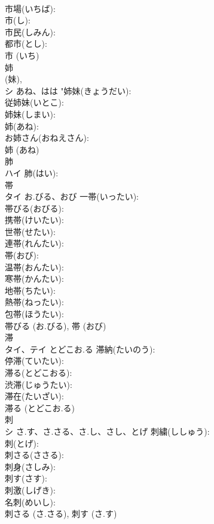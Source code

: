 \documentclass[8pt]{extreport}
\begin{document}
\begin{CJK}{UTF8}{min}
\\	市場(いちば): 
\\	市(し): 
\\	市民(しみん): 
\\	都市(とし): 
\\	市 (いち)
\\	姉			
\\	(妹), 
\\	シ	あね、はは	"姉妹(きょうだい): 
\\	従姉妹(いとこ): 
\\	姉妹(しまい): 
\\	姉(あね): 
\\	お姉さん(おねえさん): 
\\	姉 (あね)
\\	肺			
\\	ハイ		肺(はい): 
\\	帯			
\\	タイ	お.びる、おび	一帯(いったい): 
\\	帯びる(おびる): 
\\	携帯(けいたい): 
\\	世帯(せたい): 
\\	連帯(れんたい): 
\\	帯(おび): 
\\	温帯(おんたい): 
\\	寒帯(かんたい): 
\\	地帯(ちたい): 
\\	熱帯(ねったい): 
\\	包帯(ほうたい): 
\\	帯びる (お.びる), 帯 (おび)
\\	滞			
\\	タイ、テイ	とどこお.る	滞納(たいのう): 
\\	停滞(ていたい): 
\\	滞る(とどこおる): 
\\	渋滞(じゅうたい): 
\\	滞在(たいざい): 
\\	滞る (とどこお.る)
\\	刺			
\\	シ	さ.す、さ.さる、さ.し、さし、とげ	刺繍(ししゅう): 
\\	刺(とげ): 
\\	刺さる(ささる): 
\\	刺身(さしみ): 
\\	刺す(さす): 
\\	刺激(しげき): 
\\	名刺(めいし): 
\\	刺さる (さ.さる), 刺す (さ.す)

\end{CJK}
\end{document}
